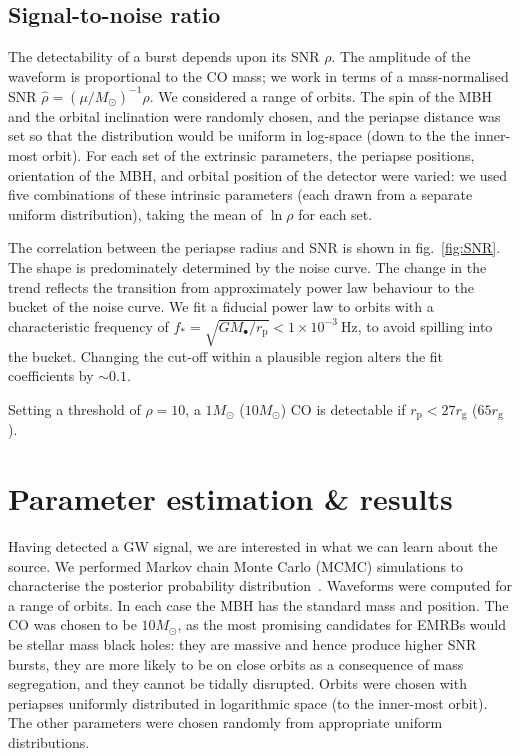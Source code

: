 \documentclass[11pt,twoside]{article}
\begin{document}
\subsection{Signal-to-noise ratio}

The detectability of a burst depends upon its SNR $\rho$. The amplitude of the waveform is proportional to the CO mass; we work in terms of a mass-normalised SNR $\hat{\rho} = (\mu/M_\odot)^{-1}\rho$. We considered a range of orbits. The spin of the MBH and the orbital inclination were randomly chosen, and the periapse distance was set so that the distribution would be uniform in log-space (down to the the inner-most orbit). For each set of the extrinsic parameters, the periapse positions, orientation of the MBH, and orbital position of the detector were varied: we used five combinations of these intrinsic parameters (each drawn from a separate uniform distribution), taking the mean of $\ln \rho$ for each set.

The correlation between the periapse radius and SNR is shown in fig.~\ref{fig:SNR}.
The shape is predominately determined by the noise curve. The change in the trend reflects the transition from approximately power law behaviour to the bucket of the noise curve. We fit a fiducial power law to orbits with a characteristic frequency of $f_\ast = \sqrt{GM_\bullet/r_\mathrm{p}} < 1 \times 10^{-3}~\mathrm{Hz}$, to avoid spilling into the bucket. Changing the cut-off within a plausible region alters the fit coefficients by $\sim 0.1$.

Setting a threshold of $\rho = 10$, a $1 M_\odot$ ($10 M_\odot$) CO is detectable if $r_\mathrm{p} < 27 r_\mathrm{g}$ ($65 r_\mathrm{g}$).

\section{Parameter estimation \& results}\label{sec:Estimation}

Having detected a GW signal, we are interested in what we can learn about the source. We performed Markov chain Monte Carlo (MCMC) simulations to characterise the posterior probability distribution~\citep[chapter 29]{MacKay2003}. Waveforms were computed for a range of orbits. In each case the MBH has the standard mass and position. The CO was chosen to be $10 M_\odot$, as the most promising candidates for EMRBs would be stellar mass black holes: they are massive and hence produce higher SNR bursts, they are more likely to be on close orbits as a consequence of mass segregation, and they cannot be tidally disrupted. Orbits were chosen with periapses uniformly distributed in logarithmic space (to the inner-most orbit). The other parameters were chosen randomly from appropriate uniform distributions. 
\end{document}
